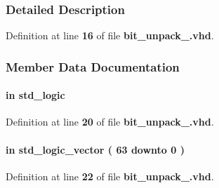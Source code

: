 \subsubsection{Detailed Description}


Definition at line {\bf 16} of file {\bf bit\+\_\+unpack\+\_.\+vhd}.



\subsubsection{Member Data Documentation}
\paragraph[{clk}]{ {\bfseries \textcolor{keywordflow}{in}\textcolor{vhdlchar}{ }} {\bfseries \textcolor{comment}{std\+\_\+logic}\textcolor{vhdlchar}{ }} \hspace{0.3cm}{\ttfamily [Port]}}\label{classbit__unpack__64_a4a4609c199d30b3adebbeb3a01276ec5}


Definition at line {\bf 20} of file {\bf bit\+\_\+unpack\+\_.\+vhd}.

\paragraph[{data\+\_\+in}]{ {\bfseries \textcolor{keywordflow}{in}\textcolor{vhdlchar}{ }} {\bfseries \textcolor{comment}{std\+\_\+logic\+\_\+vector}\textcolor{vhdlchar}{ }\textcolor{vhdlchar}{(}\textcolor{vhdlchar}{ }\textcolor{vhdlchar}{ } \textcolor{vhdldigit}{63} \textcolor{vhdlchar}{ }\textcolor{keywordflow}{downto}\textcolor{vhdlchar}{ }\textcolor{vhdlchar}{ } \textcolor{vhdldigit}{0} \textcolor{vhdlchar}{ }\textcolor{vhdlchar}{)}\textcolor{vhdlchar}{ }} \hspace{0.3cm}{\ttfamily [Port]}}\label{classbit__unpack__64_a4964e64890b447c67ae1dd95413ec8a5}


Definition at line {\bf 22} of file {\bf bit\+\_\+unpack\+\_.\+vhd}.

